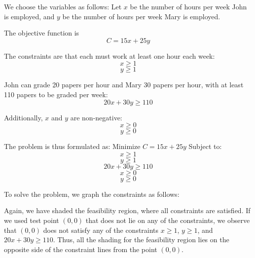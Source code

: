 \begin{solution}
    We choose the variables as follows:
    Let \( x \) be the number of hours per week John is employed,
    and \( y \) be the number of hours per week Mary is employed.

    The objective function is
    \[ C = 15x + 25y \]

    The constraints are that each must work at least one hour each week:
    \[ x \geq 1 \]
    \[ y \geq 1 \]

    John can grade 20 papers per hour and Mary 30 papers per hour, with at least 110 papers to be graded per week:
    \[ 20x + 30y \geq 110 \]

    Additionally, \( x \) and \( y \) are non-negative:
    \[ x \geq 0 \]
    \[ y \geq 0 \]

    The problem is thus formulated as:
    Minimize \( C = 15x + 25y \)
    Subject to:
    \[ x \geq 1 \]
    \[ y \geq 1 \]
    \[ 20x + 30y \geq 110 \]
    \[ x \geq 0 \]
    \[ y \geq 0 \]

    To solve the problem, we graph the constraints as follows:



    Again, we have shaded the feasibility region, where all constraints are satisfied. If we used test point $(0,0)$ that does not lie on any of the constraints, we observe that $(0, 0)$ does not satisfy any of the constraints $x \geq 1$, $y \geq 1$, and $20x + 30y \geq 110$. Thus, all the shading for the feasibility region lies on the opposite side of the constraint lines from the point $(0,0)$.


\end{solution}

